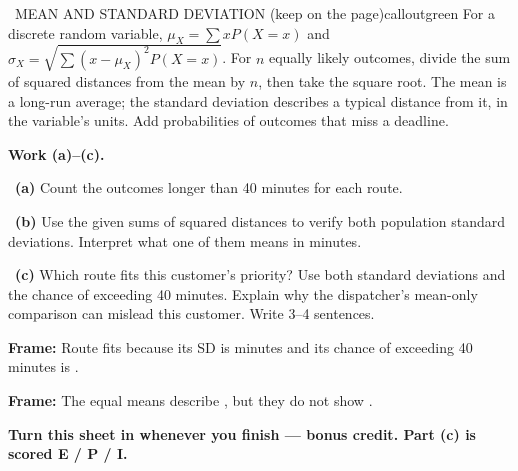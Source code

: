 \documentclass[11pt]{article}
\begin{document}
\begin{callout}{\IconBook\ MEAN AND STANDARD DEVIATION (keep on the page)}{calloutgreen}
For a discrete random variable, $\mu_X=\sum xP(X=x)$ and $\sigma_X=\sqrt{\sum(x-\mu_X)^2P(X=x)}$. For $n$ equally likely outcomes, divide the sum of squared distances from the mean by $n$, then take the square root. The mean is a long-run average; the standard deviation describes a typical distance from it, in the variable's units. Add probabilities of outcomes that miss a deadline.
\end{callout}

\newpage
\textbf{Work (a)--(c).}\par\smallskip

~\textbf{(a)} Count the outcomes longer than 40 minutes for each route.\par
\workspace{0.7in}

~\textbf{(b)} Use the given sums of squared distances to verify both population standard deviations. Interpret what one of them means in minutes.\par
\workspace{1.4in}

~\textbf{(c)} Which route fits this customer's priority? Use both standard deviations and the chance of exceeding 40 minutes. Explain why the dispatcher's mean-only comparison can mislead this customer. Write 3--4 sentences.\par
\workspace{2.0in}

\begin{sentenceframebox}\raggedright\textbf{Frame:} Route \blank[0.4in] fits because its SD is \blank[0.5in] minutes and its chance of exceeding 40 minutes is \blank[0.7in].\end{sentenceframebox}

\begin{sentenceframebox}\raggedright\textbf{Frame:} The equal means describe \blank[1.3in], but they do not show \blank[2.1in].\end{sentenceframebox}

\textbf{Turn this sheet in whenever you finish --- bonus credit. Part (c) is scored E / P / I.}\par
\end{document}
